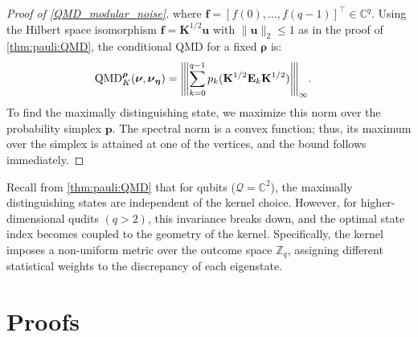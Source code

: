 \documentclass[noinfoline]{imsart}\setcounter{tocdepth}{2}
\renewcommand{\b}[1]{\mathbb{#1}} %
\newcommand{\m}[1]{\mathbf{#1}} %
\renewcommand{\c}[1]{\mathcal{#1}} %
\newcommand{\mb}[1]{\boldsymbol{#1}} %
\newcommand{\vertiii}[1]{{\left\vert\kern-0.25ex\left\vert\kern-0.25ex\left\vert #1 
    \right\vert\kern-0.25ex\right\vert\kern-0.25ex\right\vert}} %
\newcommand{\QMD}{\operatorname{QMD}}
\theoremstyle{plain}
\begin{document}
\begin{appendix}
\begin{proof}[Proof of \cref{QMD_modular_noise}]
where $\m{f} = [f(0), \dots, f(q-1)]^\top \in \b{C}^{q}$. Using the Hilbert space isomorphism $\m{f} = \m{K}^{1/2}\m{u}$ with $\|\m{u}\|_2 \le 1$ as in the proof of \cref{thm:pauli:QMD}, the conditional QMD for a fixed $\mb{\rho}$ is:
\begin{align*}
    \QMD_{K}^{\mb{\rho}}(\mb{\nu}, \mb{\nu}_{\mb{\eta}}) &= 
    \vertiii{\sum_{k=0}^{q-1} p_{k} (\m{K}^{1/2} \m{E}_{k} \m{K}^{1/2})}_{\infty}.
\end{align*}
To find the maximally distinguishing state, we maximize this norm over the probability simplex $\m{p}$. The spectral norm is a convex function; thus, its maximum over the simplex is attained at one of the vertices, and the bound follows immediately.
\end{proof}

Recall from \cref{thm:pauli:QMD} that for qubits ($\c{Q} = \b{C}^{2}$), the maximally distinguishing states are independent of the kernel choice. However, for higher-dimensional qudits $(q>2)$, this invariance breaks down, and the optimal state index becomes coupled to the geometry of the kernel. Specifically, the kernel imposes a non-uniform metric over the outcome space $\b{Z}_{q}$, assigning different statistical weights to the discrepancy of each eigenstate.


\section{Proofs}\label{sec:proof}


\end{appendix}
\end{document}
